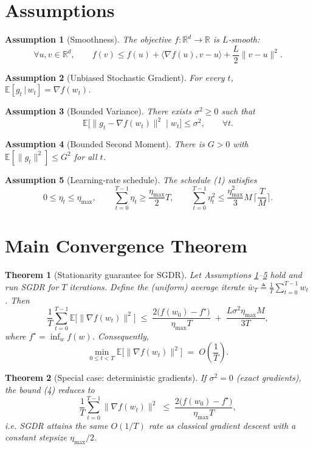 \documentclass{article}
\newtheorem{theorem}{Theorem}
\newtheorem{assumption}{Assumption}
\newcommand{\E}{\mathbb{E}}
\newcommand{\R}{\mathbb{R}}
\begin{document}
\section*{Assumptions}
\begin{assumption}[Smoothness]\label{ass:smooth}
The objective $f:\R^d\to\R$ is $L$‑smooth:
\[
    \forall u,v\in\R^d,\qquad 
    f(v)\le f(u)+\langle\nabla f(u),v-u\rangle+\frac{L}{2}\|v-u\|^2 .
\]
\end{assumption}
\begin{assumption}[Unbiased Stochastic Gradient]\label{ass:unbiased}
For every $t$, $\E[g_t\,|\,w_t]=\nabla f(w_t)$.
\end{assumption}
\begin{assumption}[Bounded Variance]\label{ass:variance}
There exists $\sigma^2\ge0$ such that
\[
    \E\bigl[\|g_t-\nabla f(w_t)\|^2\;\big|\;w_t\bigr]\le\sigma^2,
    \qquad\forall t .
\]
\end{assumption}
\begin{assumption}[Bounded Second Moment]\label{ass:bound}
There is $G>0$ with $\E[\|g_t\|^2]\le G^2$ for all $t$.
\end{assumption}
\begin{assumption}[Learning‑rate schedule]\label{ass:schedule}
The schedule (1) satisfies
\[
    0\le\eta_t\le\eta_{\max},\qquad 
    \sum_{t=0}^{T-1}\eta_t\ge \frac{\eta_{\max}}{2}T,
    \qquad 
    \sum_{t=0}^{T-1}\eta_t^{2}\le\frac{\eta_{\max}^{2}}{3}M\,\Big\lceil\frac{T}{M}\Big\rceil .
\tag{3}
\]
\end{assumption}

\section*{Main Convergence Theorem}
\begin{theorem}[Stationarity guarantee for SGDR]\label{thm:sgdr}
Let Assumptions \ref{ass:smooth}–\ref{ass:schedule} hold and run SGDR for $T$ iterations.
Define the (uniform) average iterate $\bar w_T\triangleq\frac1T\sum_{t=0}^{T-1}w_t$.
Then
\[
\frac1T\sum_{t=0}^{T-1}\E\bigl[\|\nabla f(w_t)\|^{2}\bigr]
\;\le\;
\frac{2\bigl(f(w_0)-f^{\star}\bigr)}{\eta_{\max}T}
\;+\;
\frac{L\sigma^{2}\eta_{\max}M}{3T},
\tag{4}
\]
where $f^{\star}= \inf_{w}f(w)$.
Consequently,
\[
\min_{0\le t<T}\E\bigl[\|\nabla f(w_t)\|^{2}\bigr]
\;=\;
O\!\left(\frac{1}{T}\right) .
\]
\end{theorem}

\begin{theorem}[Special case: deterministic gradients]\label{thm:det}
If $\sigma^{2}=0$ (exact gradients), the bound (4) reduces to
\[
\frac1T\sum_{t=0}^{T-1}\|\nabla f(w_t)\|^{2}
\;\le\;
\frac{2\bigl(f(w_0)-f^{\star}\bigr)}{\eta_{\max}T},
\]
i.e. SGDR attains the same $O(1/T)$ rate as classical gradient descent with a constant stepsize $\eta_{\max}/2$.
\end{theorem}
\end{document}
